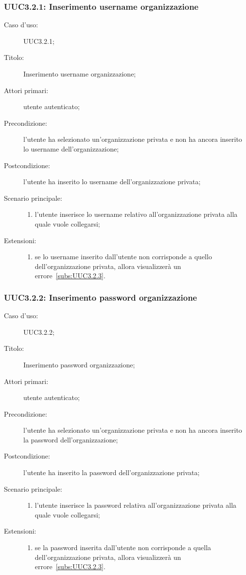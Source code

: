 \documentclass[../../../analisi-dei-requisiti.tex]{subfiles}
\begin{document}
\subsubsection{UUC3.2.1: Inserimento username organizzazione}%
\label{subs:UUC3.2.1}
\begin{description}
  \item[Caso d’uso:] UUC3.2.1;
  \item[Titolo:] Inserimento username organizzazione;
  \item[Attori primari:] utente autenticato;
  \item[Precondizione:] l'utente ha selezionato un'organizzazione privata e non ha ancora inserito lo username dell'organizzazione;
  \item[Postcondizione:] l'utente ha inserito lo username dell'organizzazione privata;
  \item[Scenario principale:]
        \begin{enumerate}
          \item l'utente inserisce lo username relativo all'organizzazione privata alla quale vuole collegarsi;
        \end{enumerate}
  \item[Estensioni:]
        \begin{enumerate}
          \item se lo username inserito dall'utente non corrisponde a quello dell'organizzazione privata, allora visualizzerà un errore~\ref{subs:UUC3.2.3}.
        \end{enumerate}
\end{description}

\subsubsection{UUC3.2.2: Inserimento password organizzazione}%
\label{subs:UUC3.2.2}
\begin{description}
  \item[Caso d’uso:] UUC3.2.2;
  \item[Titolo:] Inserimento password organizzazione;
  \item[Attori primari:] utente autenticato;
  \item[Precondizione:] l'utente ha selezionato un'organizzazione privata e non ha ancora inserito la password dell'organizzazione;
  \item[Postcondizione:] l'utente ha inserito la password dell'organizzazione privata;
  \item[Scenario principale:]
        \begin{enumerate}
          \item l'utente inserisce la password relativa all'organizzazione privata alla quale vuole collegarsi;
        \end{enumerate}
  \item[Estensioni:]
        \begin{enumerate}
          \item se la password inserita dall'utente non corrisponde a quella dell'organizzazione privata, allora visualizzerà un errore~\ref{subs:UUC3.2.3}.
        \end{enumerate}
\end{description}
\end{document}

